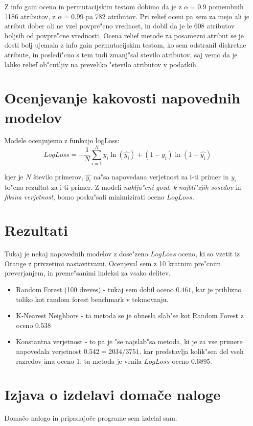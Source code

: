 \documentclass[a4paper,11pt]{article}
\begin{document}
Z info gain oceno in permutacijskim testom dobimo da je z $ \alpha = 0.9$ pomembnih 1186 atributov, z $ \alpha = 0.99$ pa 782 atributov. Pri relief oceni pa sem za mejo ali je atribut dober ali ne vzel povpre"cno vrednost, in dobil da je le 608 atributov boljsih od povpre"cne vrednosti. Ocena relief metode za posamezni atribut se je dosti bolj ujemala z info gain permutacijskim testom, ko sem odstranil diskretne atribute, in posledi"cno s tem tudi zmanj"sal stevilo atributov, saj vemo da je lahko relief ob"cutljiv na preveliko "stevilo atributov v podatkih.
 
 
 \section{Ocenjevanje kakovosti napovednih modelov}
Modele ocenjujemo z funkcijo logLoss:
\[ LogLoss=-\frac{1}{N}\sum_{i=1}^Ny_i\ln\left(\hat{y_i}\right)+\left(1-y_i\right)\ln\left(1-\hat{y_i}\right) \]

kjer je $N$ število primerov, $\hat{y_i}$ na"sa napovedana verjetnost za i-ti primer in $y_i$  to"cna rezultat za i-ti primer.
Z modeli \textit{naklju"cni gozd}, \textit{k-najbli"zjih sosedov} in \textit{fiksna verjetnost}, bomo posku"sali minimizirati oceno $LogLoss$.

\section{Rezultati}

Tukaj je nekaj napovednih modelov z dose"zeno $LogLoss$ oceno, ki so vzetit iz Orange z privzetimi nastavitvami. Ocenjeval sem z 10 kratnim pre"cnim preverjanjem, in preme"sanimi indeksi za vsako delitev.

\begin{itemize}
\item Random Forest (100 dreves) - tukaj sem dobil oceno $0.461$, kar je priblizno toliko kot random forest benchmark v tekmovanju.
\item K-Nearest Neighbors - ta metoda se je obnesla slab"se kot Random Forest z oceno $0.538$
\item Konstantna verjetnost - to pa je "se najslab"sa metoda, ki je za vse primere napovedala verjetnost  $0.542 = 2034/3751$, kar predstavlja kolik"sen del vseh razredov ima oceno 1. ta metoda je vrnila $LogLoss$ oceno $0.6895$.
\end{itemize}



\section{Izjava o izdelavi domače naloge}
Domačo nalogo in pripadajoče programe sem izdelal sam.
\end{document}
